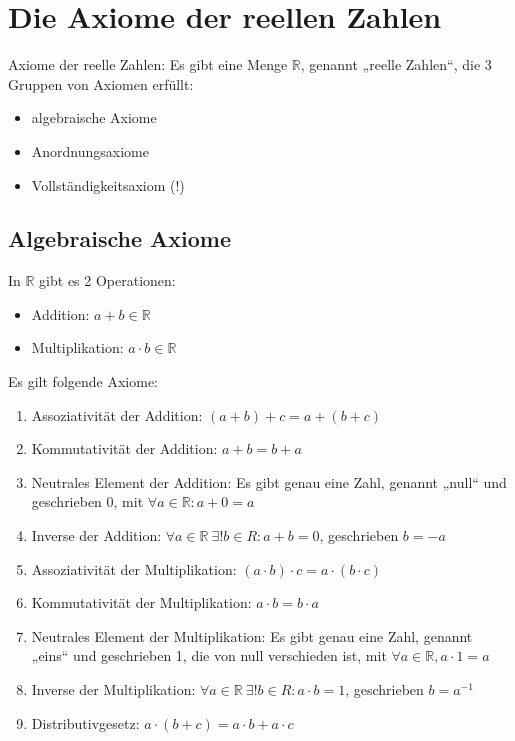 \chapter{Die Axiome der reellen Zahlen}
Axiome der reelle Zahlen: Es gibt eine Menge $\mathbb{R}$, genannt „reelle Zahlen“, die 3 Gruppen von Axiomen erfüllt:
\begin{itemize}
\item algebraische Axiome
\item Anordnungsaxiome
\item Vollständigkeitsaxiom (!)
\end{itemize}

\section{Algebraische Axiome}
In $\mathbb{R}$ gibt es 2 Operationen:
\begin{itemize}
\item Addition: $a+b \in \mathbb{R}$\index[sym]{$+$}
\item Multiplikation: $a \cdot b \in \mathbb{R}$\index[sym]{$\cdot$}
\end{itemize}

Es gilt folgende Axiome:
\begin{enumerate}
\item Assoziativität der Addition: $(a + b) + c = a + (b + c)$
\item Kommutativität der Addition: $a + b = b + a$
\item Neutrales Element der Addition: Es gibt genau eine Zahl, genannt „null“ und geschrieben 0, mit $\forall a \in \mathbb{R}: a + 0 = a$
\item Inverse der Addition: $\forall a \in \mathbb{R}\: \exists! b \in R: a + b = 0$, geschrieben $b = -a$
\item Assoziativität der Multiplikation: $(a \cdot b) \cdot c = a \cdot (b \cdot c)$
\item Kommutativität der Multiplikation: $a \cdot b = b \cdot a$
\item Neutrales Element der Multiplikation: Es gibt genau eine Zahl, genannt „eins“ und geschrieben 1, die von null verschieden ist, mit $\forall a \in \mathbb{R}, a \cdot 1 = a$
\item Inverse der Multiplikation: $\forall a \in \mathbb{R}\: \exists! b \in R: a \cdot b = 1$, geschrieben $b = a^{-1}$
\item Distributivgesetz: $a \cdot (b + c) = a \cdot b + a \cdot c$
\end{enumerate}

